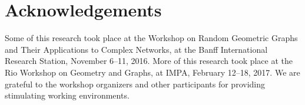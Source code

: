 \documentclass[lotsofwhite]{patmorin}
\DeclareMathOperator{\exponential}{exponential}
\DeclareMathOperator{\gammarv}{Gamma}
\begin{document}
%
%


\section*{Acknowledgements}

Some of this research took place at the Workshop on Random Geometric
Graphs and Their Applications to Complex Networks, at the Banff
International Research Station, November 6--11, 2016.  More of this
research took place at the Rio Workshop on Geometry and Graphs, at IMPA,
February 12--18, 2017.  We are grateful to the workshop organizers and
other participants for providing stimulating working environments.
\end{document}
